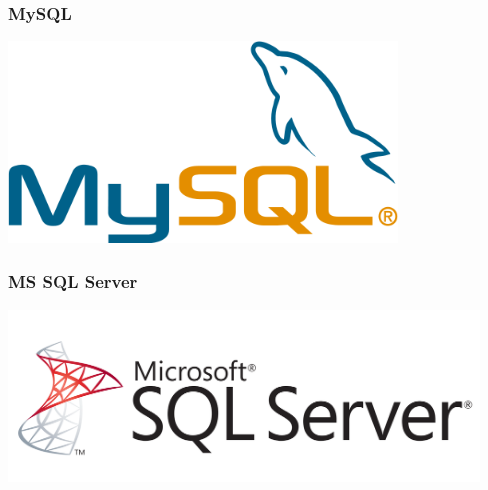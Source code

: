 \documentclass{beamer}
\begin{document}
\begin{frame}
  \frametitle{MySQL}


  \begin{center}
    \includegraphics[height=2.1in]{mysql.png}
  \end{center}
\end{frame}

\begin{frame}
  \frametitle{MS SQL Server}


  \begin{center}
    \includegraphics[height=1.8in]{mssql.png}
  \end{center}
\end{frame}
\end{document}
